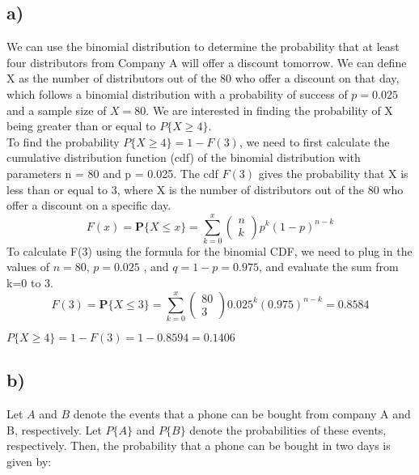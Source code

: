 \documentclass[12pt]{article}
\begin{document}
\subsection*{a)} 
We can use the binomial distribution to determine the probability that at least four distributors from Company A will offer a discount tomorrow. We can define X as the number of distributors out of the 80 who offer a discount on that day, which follows a binomial distribution with a probability of success of $p=0.025$ and a sample size of $X=80$. We are interested in finding the probability of X being greater than or equal to $P\{X \ge 4\}$.\\
To find the probability $P\{X \ge 4\} = 1 -  F(3)$, we need to first calculate the cumulative distribution function (cdf) of the binomial distribution with parameters n = 80 and p = 0.025. The cdf $F(3)$ gives the probability that X is less than or equal to $3$, where X is the number of distributors out of the 80 who offer a discount on a specific day.
$$
F(x)=\boldsymbol{P}\{X \leq x\}=\sum_{k=0}^x\left(\begin{array}{c}
n \\
k
\end{array}\right) p^k(1-p)^{n-k}
$$
To calculate F(3) using the formula for the binomial CDF, we need to plug in the values of $n=80$, $p=0.025$ , and $q= 1- p = 0.975$, and evaluate the sum from k=0 to 3.
$$
F(3)=\boldsymbol{P}\{X \leq 3\}=\sum_{k=0}^x\left(\begin{array}{c}
80 \\
3
\end{array}\right) 0.025^k(0.975)^{n-k} = 0.8584
$$

\begin{center}
$P\{X \ge 4\} = 1 -  F(3) = 1 - 0.8594 = 0.1406 $\\
\end{center}

\subsection*{b)} 
Let $A$ and $B$ denote the events that a phone can be bought from company A and B, respectively. Let $P\{A\}$ and $P\{B\}$ denote the probabilities of these events, respectively. Then, the probability that a phone can be bought in two days is given by:
\end{document}
